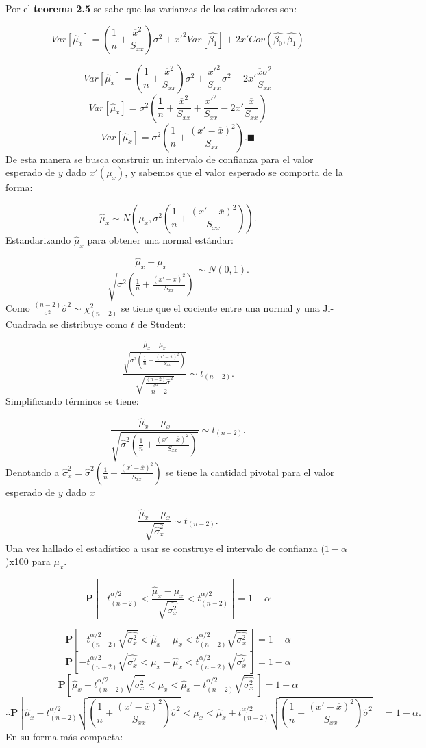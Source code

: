 \documentclass[
  a4paper,
  oneside,
  openany]{book}
\begin{document}
Por el \textbf{teorema 2.5} se sabe que las varianzas de los estimadores son:

\[Var[\hat{\mu}_{x}]=\left( \frac{1}{n}+\frac{\overline{x}^2}{S_{xx}}\right)\sigma^2+x'^2Var[\hat{\beta_{1}}]+2x'Cov(\hat{\beta_{0}},\hat{\beta_{1}})\]

\[Var[\hat{\mu}_{x}]=\left( \frac{1}{n}+\frac{\overline{x}^2}{S_{xx}}\right)\sigma^2+\frac{x'^2}{S_{xx}}\sigma^2-2x'\frac{\overline{x}\sigma^2}{S_{xx}}\]
\[Var[\hat{\mu}_{x}]=\sigma^2\left( \frac{1}{n}+\frac{\overline{x}^2}{S_{xx}}+\frac{x'^2}{S_{xx}}-2x'\frac{\overline{x}}{S_{xx}}\right)\]
\[Var[\hat{\mu}_{x}]=\sigma^2\left( \frac{1}{n}+\frac{(x'-\overline{x})^2}{S_{xx}}\right). \blacksquare\]
De esta manera se busca construir un intervalo de confianza para el valor esperado de \(y\) dado \(x'(\mu_{x})\), y sabemos que el valor esperado se comporta de la forma:

\[\hat{\mu}_{x}\sim N\left(\mu_{x},\sigma^2\left( \frac{1}{n}+\frac{(x'-\overline{x})^2}{S_{xx}}\right)\right).\]
Estandarizando \(\hat{\mu}_{x}\) para obtener una normal estándar:

\[\frac{\hat{\mu}_{x}-\mu_{x}}{\sqrt{\sigma^2\left( \frac{1}{n}+\frac{(x'-\overline{x})^2}{S_{xx}}\right)}}\sim N(0,1).\]
Como \(\frac{(n-2)}{\sigma^2}\hat{\sigma}^2\sim\chi^2_{(n-2)}\) se tiene que el cociente entre una normal y una Ji-Cuadrada se distribuye como \(t\) de Student:

\[\frac{\frac{\hat{\mu}_{x}-\mu_{x}}{\sqrt{\sigma^2\left( \frac{1}{n}+\frac{(x'-\overline{x})^2}{S_{xx}}\right)}}}{\sqrt{\frac{\frac{(n-2)}{\sigma^2}\hat{\sigma}^2}{n-2}}}\sim t_{(n-2)}.\]
Simplificando términos se tiene:

\[\frac{\hat{\mu}_{x}-\mu_{x}}{\sqrt{\hat{\sigma}^2\left( \frac{1}{n}+\frac{(x'-\overline{x})^2}{S_{xx}}\right)}}\sim t_{(n-2)}.\]
Denotando a \(\hat{\sigma}_{x}^2=\hat{\sigma}^2\left(\frac{1}{n}+\frac{(x'-\overline{x})^2}{S_{xx}}\right)\) se tiene la cantidad pivotal para el valor esperado de \(y\) dado \(x\)

\[\frac{\hat{\mu}_{x}-\mu_{x}}{\sqrt{\hat{\sigma}_{x}^2}}\sim t_{(n-2)}.\]
Una vez hallado el estadístico a usar se construye el intervalo de confianza (\(1-\alpha\))x100 para \(\mu_{x}\).

\[\mathbf{P}\left[-t_{(n-2)}^{\alpha/2} < \frac{\hat{\mu}_{x}-\mu_{x}}{\sqrt{\hat{\sigma_{x}^2}}} < t_{(n-2)}^{\alpha/2}\right]=1-\alpha\]

\[\mathbf{P}\left[-t_{(n-2)}^{\alpha/2}\sqrt{\hat{\sigma_{x}^2}}<\hat{\mu}_{x}-\mu_{x}<t_{(n-2)}^{\alpha/2}\sqrt{\hat{\sigma_{x}^2}} \ \right]=1-\alpha\]
\[\mathbf{P}\left[-t_{(n-2)}^{\alpha/2}\sqrt{\hat{\sigma_{x}^2}}<\mu_{x}-\hat{\mu}_{x}<t_{(n-2)}^{\alpha/2}\sqrt{\hat{\sigma_{x}^2}} \ \right]=1-\alpha\]
\[\mathbf{P}\left[\hat{\mu}_{x}-t_{(n-2)}^{\alpha/2}\sqrt{\hat{\sigma_{x}^2}}<\mu_{x}<\hat{\mu}_{x}+t_{(n-2)}^{\alpha/2}\sqrt{\hat{\sigma_{x}^2}} \ \right]=1-\alpha\]
\[\therefore \mathbf{P}\left[\hat{\mu}_{x}-t_{(n-2)}^{\alpha/2}\sqrt{\left( \frac{1}{n}+\frac{(x'-\overline{x})^2}{S_{xx}}\right)\hat{\sigma}^2}<\mu_{x}<\hat{\mu}_{x}+t_{(n-2)}^{\alpha/2}\sqrt{\left( \frac{1}{n}+\frac{(x'-\overline{x})^2}{S_{xx}}\right)\hat{\sigma}^2} \ \ \right]=1-\alpha.\]
En su forma más compacta:
\end{document}
